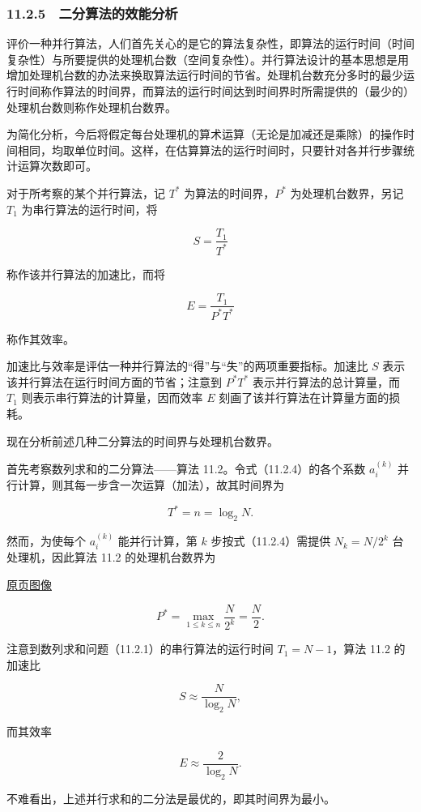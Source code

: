 \documentclass[
  10pt,
  fontset=fandol]{ctexart}
\begin{document}
\subsubsection{11.2.5　二分算法的效能分析}\label{ux4e8cux5206ux7b97ux6cd5ux7684ux6548ux80fdux5206ux6790}

评价一种并行算法，人们首先关心的是它的算法复杂性，即算法的运行时间（时间复杂性）与所要提供的处理机台数（空间复杂性）。并行算法设计的基本思想是用增加处理机台数的办法来换取算法运行时间的节省。处理机台数充分多时的最少运行时间称作算法的时间界，而算法的运行时间达到时间界时所需提供的（最少的）处理机台数则称作处理机台数界。

为简化分析，今后将假定每台处理机的算术运算（无论是加减还是乘除）的操作时间相同，均取单位时间。这样，在估算算法的运行时间时，只要针对各并行步骤统计运算次数即可。

对于所考察的某个并行算法，记 \(T^*\) 为算法的时间界，\(P^*\) 为处理机台数界，另记 \(T_1\) 为串行算法的运行时间，将

\[
S=\frac{T_1}{T^*}
\]

称作该并行算法的加速比，而将

\[
E=\frac{T_1}{P^*T^*}
\]

称作其效率。

加速比与效率是评估一种并行算法的``得''与``失''的两项重要指标。加速比 \(S\) 表示该并行算法在运行时间方面的节省；注意到 \(P^*T^*\) 表示并行算法的总计算量，而 \(T_1\) 则表示串行算法的计算量，因而效率 \(E\) 刻画了该并行算法在计算量方面的损耗。

现在分析前述几种二分算法的时间界与处理机台数界。

首先考察数列求和的二分算法------算法 11.2。令式（11.2.4）的各个系数 \(a_i^{(k)}\) 并行计算，则其每一步含一次运算（加法），故其时间界为

\[
T^*=n=\log_2 N.
\]

然而，为使每个 \(a_i^{(k)}\) 能并行计算，第 \(k\) 步按式（11.2.4）需提供 \(N_k=N/2^k\) 台处理机，因此算法 11.2 的处理机台数界为

\href{../../source-images/pdf-284.jpeg}{原页图像}

\[
P^*=\max_{1\le k\le n}\frac{N}{2^k}=\frac{N}{2}.
\]

注意到数列求和问题（11.2.1）的串行算法的运行时间 \(T_1=N-1\)，算法 11.2 的加速比

\[
S\approx\frac{N}{\log_2 N},
\]

而其效率

\[
E\approx\frac{2}{\log_2 N}.
\]

不难看出，上述并行求和的二分法是最优的，即其时间界为最小。
\end{document}
